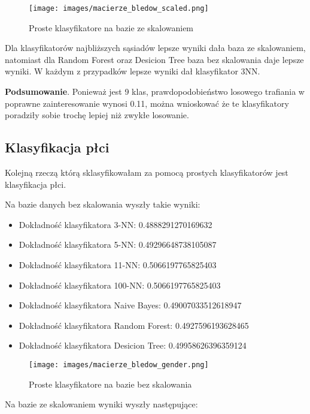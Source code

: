\documentclass[12pt,a4paper]{article}
\begin{document}
\begin{figure}[h]
    \centering
    \texttt{[image: images/macierze\_bledow\_scaled.png]}
    \caption{Proste klasyfikatore na bazie ze skalowaniem}
    \label{fig:pk1}
\end{figure}


Dla klasyfikatorów najbliższych sąsiadów lepsze wyniki dała baza ze skalowaniem, natomiast dla Random Forest oraz Desicion Tree baza bez skalowania daje lepsze wyniki. W każdym z przypadków lepsze wyniki dał klasyfikator 3NN.

\textbf{Podsumowanie}. Ponieważ jest 9 klas, prawdopodobieństwo losowego trafiania w poprawne zainteresowanie wynosi 0.11, można wnioskować że te klasyfikatory poradziły sobie trochę lepiej niż zwykłe losowanie.

\newpage

\subsection{Klasyfikacja płci}

Kolejną rzeczą którą sklasyfikowałam za pomocą prostych klasyfikatorów jest klasyfikacja płci.

Na bazie danych bez skalowania wyszły takie wyniki:

\begin{itemize}
    \item Dokładność klasyfikatora 3-NN: 0.4888291270169632
    \item Dokładność klasyfikatora 5-NN: 0.49296648738105087
    \item Dokładność klasyfikatora 11-NN: 0.5066197765825403
    \item Dokładność klasyfikatora 100-NN: 0.5066197765825403
    \item Dokładność klasyfikatora Naive Bayes: 0.49007033512618947
    \item Dokładność klasyfikatora Random Forest: 0.4927596193628465
    \item Dokładność klasyfikatora Desicion Tree: 0.49958626396359124
\end{itemize}

\begin{figure}[h]
    \centering
    \texttt{[image: images/macierze\_bledow\_gender.png]}
    \caption{Proste klasyfikatore na bazie bez skalowania}
    \label{fig:pk2}
\end{figure}

Na bazie ze skalowaniem wyniki wyszły następujące:
\end{document}
